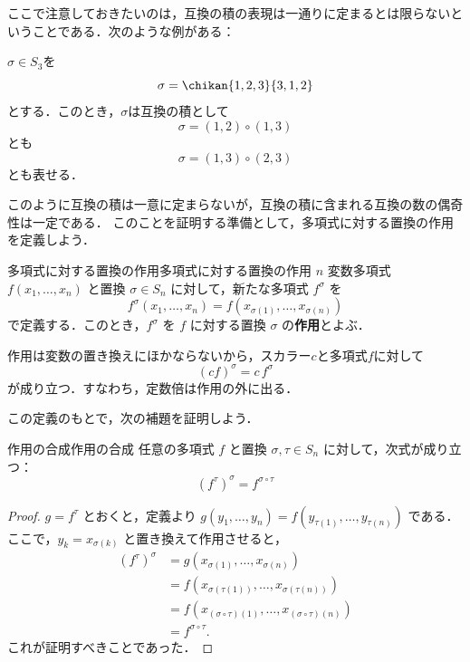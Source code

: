 ここで注意しておきたいのは，互換の積の表現は一通りに定まるとは限らないということである．次のような例がある：

\begin{example}{}{}
  $\sigma \in S_3$を
  \[
  \sigma = \chikan{1, 2, 3}{3, 1, 2}
  \]
  とする．このとき，$\sigma$は互換の積として
  \[
  \sigma = (1, 2) \circ (1, 3)
  \]
  とも
  \[
  \sigma = (1, 3) \circ (2, 3)
  \]
  とも表せる．
\end{example}

このように互換の積は一意に定まらないが，互換の積に含まれる互換の数の偶奇性は一定である．
このことを証明する準備として，多項式に対する置換の作用を定義しよう．

\begin{definition}{多項式に対する置換の作用}{多項式に対する置換の作用}
  $n$ 変数多項式 $f(x_1, \dots, x_n)$ と置換 $\sigma \in S_n$ に対して，新たな多項式 $f^\sigma$ を
  \[
  f^\sigma(x_1, \dots, x_n) = f(x_{\sigma(1)}, \dots, x_{\sigma(n)})
  \]
  で定義する．このとき，$f^\sigma$ を $f$ に対する置換 $\sigma$ の\textbf{作用}とよぶ．
\end{definition}

作用は変数の置き換えにほかならないから，スカラー$c$と多項式$f$に対して
\[
  (cf)^\sigma = c\,f^\sigma
\]
が成り立つ．すなわち，定数倍は作用の外に出る．

この定義のもとで，次の補題を証明しよう．
\begin{lemma}{作用の合成}{作用の合成}
  任意の多項式 $f$ と置換 $\sigma, \tau \in S_n$ に対して，次式が成り立つ：
  \[
  (f^\tau)^\sigma = f^{\sigma \circ \tau}
  \]
\end{lemma}

\begin{leftbar}
\begin{proof}
  $g = f^\tau$ とおくと，定義より $g(y_1, \dots, y_n) = f(y_{\tau(1)}, \dots, y_{\tau(n)})$ である．
  ここで，$y_k = x_{\sigma(k)}$ と置き換えて作用させると，
  \begin{align*}
    (f^\tau)^\sigma &= g(x_{\sigma(1)}, \dots, x_{\sigma(n)}) \\
    &= f(x_{\sigma(\tau(1))}, \dots, x_{\sigma(\tau(n))}) \\
    &= f(x_{(\sigma \circ \tau)(1)}, \dots, x_{(\sigma \circ \tau)(n)}) \\
    &= f^{\sigma \circ \tau}.
  \end{align*}
  これが証明すべきことであった．
\end{proof}
\end{leftbar}

